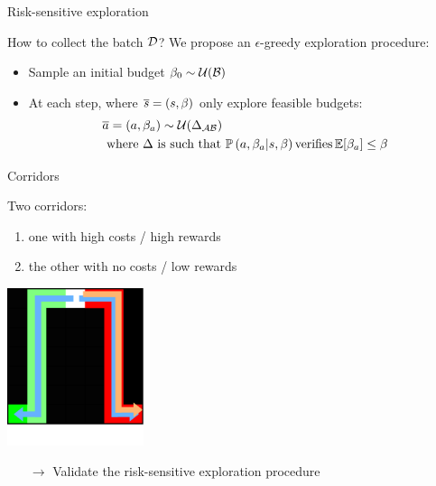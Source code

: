 \documentclass[slideopt,A4,showboxes,svgnames]{beamer}
\begin{document}
\begin{frame}{Risk-sensitive exploration}
\begin{alertblock}{How to collect the batch $\mathcal{D}$?}
We propose an $\epsilon$-greedy exploration procedure:
\pause
\begin{itemize}[<+->]
	\item Sample an initial budget $\beta_0\sim\mathcal{U}(\mathcal{B})$
	\item At each step, where $\overline{s}=(s,\beta)$ only explore feasible budgets:
	\begin{align*}
	&\overline{a} = (a, \beta_a)\sim\mathcal{U}(\Delta_{\mathcal{A}\mathcal{B}})\\
	&\text{ where }  \Delta \text{ is such that }\mathbb{P}\left(a, \beta_a|s, \beta\right) \text{verifies} \operatorname*{\mathbb{E}}[\beta_a]\leq\beta
	\end{align*}
\end{itemize}
\end{alertblock}
\end{frame}

\begin{frame}{Corridors}

Two corridors:
\begin{enumerate}
\item one with {\red high costs / high rewards}
\item the other with {\green no costs / low rewards}
\end{enumerate}

\begin{center}
	\includegraphics[width=0.3\textwidth]{../../source/img/corridors_paths}
\end{center}

\begin{itemize}
	\item[$\rightarrow$] Validate the \alert{risk-sensitive exploration} procedure
\end{itemize}

\end{frame}
\end{document}
